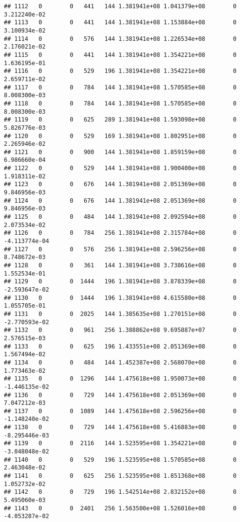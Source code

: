 \documentclass[
]{article}
\begin{document}
\begin{enumerate}
\begin{verbatim}
## 1112   0        0   441   144 1.381941e+08 1.041379e+08        0  3.212240e-02
## 1113   0        0   441   144 1.381941e+08 1.153884e+08        0  3.100934e-02
## 1114   0        0   576   144 1.381941e+08 1.226534e+08        0  2.176021e-02
## 1115   0        0   441   144 1.381941e+08 1.354221e+08        0  1.636195e-01
## 1116   0        0   529   196 1.381941e+08 1.354221e+08        0  2.659711e-02
## 1117   0        0   784   144 1.381941e+08 1.570585e+08        0  8.008300e-03
## 1118   0        0   784   144 1.381941e+08 1.570585e+08        0  8.008300e-03
## 1119   0        0   625   289 1.381941e+08 1.593098e+08        0  5.826776e-03
## 1120   0        0   529   169 1.381941e+08 1.802951e+08        0  2.265946e-02
## 1121   0        0   900   144 1.381941e+08 1.859159e+08        0  6.986660e-04
## 1122   0        0   529   144 1.381941e+08 1.900400e+08        0  1.918311e-02
## 1123   0        0   676   144 1.381941e+08 2.051369e+08        0  9.846956e-03
## 1124   0        0   676   144 1.381941e+08 2.051369e+08        0  9.846956e-03
## 1125   0        0   484   144 1.381941e+08 2.092594e+08        0  2.073534e-02
## 1126   0        0   784   256 1.381941e+08 2.315784e+08        0 -4.113774e-04
## 1127   0        0   576   256 1.381941e+08 2.596256e+08        0  8.748672e-03
## 1128   0        0   361   144 1.381941e+08 3.738616e+08        0  1.552534e-01
## 1129   0        0  1444   196 1.381941e+08 3.878339e+08        0 -2.593647e-02
## 1130   0        0  1444   196 1.381941e+08 4.615580e+08        0  1.055705e-01
## 1131   0        0  2025   144 1.385635e+08 1.270151e+08        0 -2.770593e-02
## 1132   0        0   961   256 1.388862e+08 9.695887e+07        0  2.576515e-03
## 1133   0        0   625   196 1.433551e+08 2.051369e+08        0  1.567494e-02
## 1134   0        0   484   144 1.452387e+08 2.568070e+08        0  1.773463e-02
## 1135   0        0  1296   144 1.475618e+08 1.950073e+08        0 -1.446135e-02
## 1136   0        0   729   144 1.475618e+08 2.051369e+08        0  7.047212e-03
## 1137   0        0  1089   144 1.475618e+08 2.596256e+08        0 -1.148240e-02
## 1138   0        0   729   144 1.475618e+08 5.416883e+08        0 -8.295446e-03
## 1139   0        0  2116   144 1.523595e+08 1.354221e+08        0 -3.048048e-02
## 1140   0        0   529   196 1.523595e+08 1.570585e+08        0  2.463048e-02
## 1141   0        0   625   256 1.523595e+08 1.851368e+08        0  1.052732e-02
## 1142   0        0   729   196 1.542514e+08 2.832152e+08        0  5.495060e-03
## 1143   0        0  2401   256 1.563500e+08 1.526016e+08        0 -4.053287e-02

\end{verbatim}
\end{enumerate}
\end{document}
